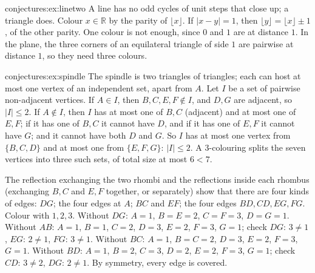 \begin{solution}{conjectures:ex:linetwo}
\idea A line has no odd cycles of unit steps that close up; a triangle does.
\writeup Colour $x\in\mathbb R$ by the parity of $\lfloor x\rfloor$. If $|x-y|=1$, then $\lfloor y\rfloor=\lfloor x\rfloor\pm1$, of the other parity. One
colour is not enough, since $0$ and $1$ are at distance $1$. In the plane, the three corners of an equilateral triangle of side $1$ are pairwise at
distance $1$, so they need three colours.
\end{solution}

\begin{solution}{conjectures:ex:spindle}
\idea The spindle is two triangles of triangles; each can host at most one vertex of an independent set, apart from $A$.
\writeup Let $I$ be a set of pairwise non-adjacent vertices. If $A\in I$, then $B,C,E,F\notin I$, and $D,G$ are adjacent, so $|I|\le2$. If $A\notin I$,
then $I$ has at most one of $B,C$ (adjacent) and at most one of $E,F$; if it has one of $B,C$ it cannot have $D$, and if it has one of $E,F$ it cannot
have $G$; and it cannot have both $D$ and $G$. So $I$ has at most one vertex from $\{B,C,D\}$ and at most one from $\{E,F,G\}$: $|I|\le2$. A
$3$-colouring splits the seven vertices into three such sets, of total size at most $6<7$.

The reflection exchanging the two rhombi and the reflections inside each rhombus (exchanging $B,C$ and $E,F$ together, or separately) show that there are
four kinds of edges: $DG$; the four edges at $A$; $BC$ and $EF$; the four edges $BD,CD,EG,FG$. Colour with $1,2,3$. Without $DG$: $A=1$, $B=E=2$,
$C=F=3$, $D=G=1$. Without $AB$: $A=1$, $B=1$, $C=2$, $D=3$, $E=2$, $F=3$, $G=1$; check $DG$: $3\ne1$, $EG$: $2\ne1$, $FG$: $3\ne1$. Without $BC$:
$A=1$, $B=C=2$, $D=3$, $E=2$, $F=3$, $G=1$. Without $BD$: $A=1$, $B=2$, $C=3$, $D=2$, $E=2$, $F=3$, $G=1$; check $CD$: $3\ne2$, $DG$: $2\ne1$. By
symmetry, every edge is covered.
\end{solution}

